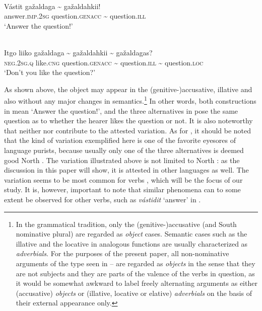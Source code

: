 \documentclass[output=paper]{LSP/langsci}
\begin{document}
\begin{exe}
\ex%
\label{16-ki-ex:2}
\\
\gll Vástit gažaldaga {\textasciitilde} gažaldahkii!\\
answer.\textsc{imp}.2\textsc{sg} question.\textsc{genacc} {\textasciitilde} question.\textsc{ill}\\
\glt  ‘Answer the question!’
\end{exe}


\begin{exe}
\ex%
\label{16-ki-ex:3}
\\
\gll Itgo liiko gažaldaga {\textasciitilde} gažaldahkii {\textasciitilde} gažaldagas?\\
\textsc{neg}.\textsc{2sg}.\textsc{q} like.\textsc{cng} question.\textsc{genacc} {\textasciitilde} question.\textsc{ill} {\textasciitilde} question.\textsc{loc}\\
\glt  ‘Don’t you like the question?’
\end{exe}


As shown above, the object may appear in the (genitive-)accusative, illative and also  without any major changes in semantics.\footnote{In the  grammatical tradition, only the (genitive-)accusative (and South  nominative plural) are regarded as \textit{object} cases. Semantic cases such as the illative and the locative in analogous functions are usually characterized as \textit{adverbials}. For the purposes of the present paper, all non-nominative arguments of the type seen in -- are regarded as \textit{objects} in the sense that they are not subjects and they are parts of the valence of the verbs in question, as it would be somewhat awkward to label freely alternating arguments as either (accusative) \textit{objects} or (illative, locative or elative) \textit{adverbials} on the basis of their external appearance only.} In other words, both constructions in  mean ‘Answer the question!’, and the three alternatives in  pose the same question as to whether the hearer likes the question or not. It is also noteworthy that neither  nor  contribute to the attested variation. As for , it should be noted that the kind of variation exemplified here is one of the favorite eyesores of  language purists, because usually only one of the three alternatives is deemed good North . The variation illustrated above is not limited to North : as the discussion in this paper will show, it is attested in other  languages as well. The variation seems to be most common for  verbs , which will be the focus of our study. It is, however, important to note that similar phenomena can to some extent be observed for other verbs, such as \textit{vástidit} ‘answer’ in .
\end{document}
